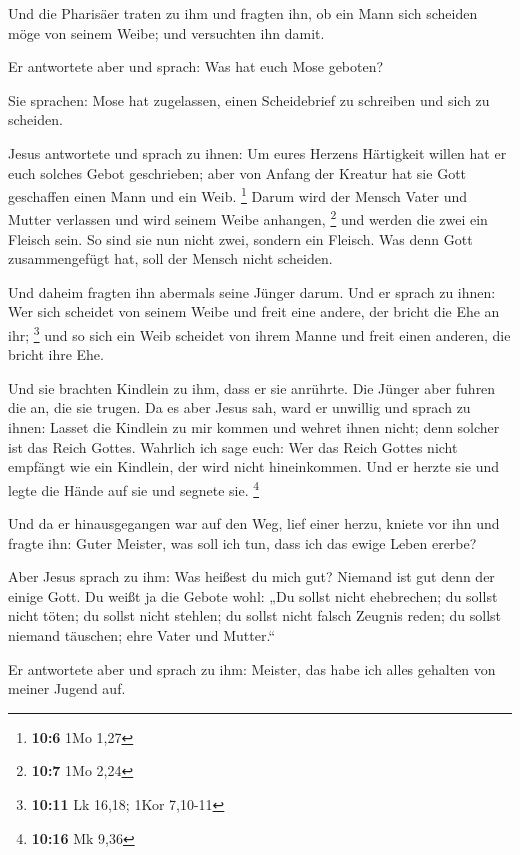  Und die Pharisäer traten zu ihm und fragten ihn, ob ein
Mann sich scheiden möge von seinem Weibe; und versuchten ihn damit.

 Er antwortete aber und sprach: Was hat euch Mose geboten?

 Sie sprachen: Mose hat zugelassen, einen Scheidebrief zu
schreiben und sich zu scheiden.

 Jesus antwortete und sprach zu ihnen: Um eures Herzens
Härtigkeit willen hat er euch solches Gebot geschrieben; 
aber von Anfang der Kreatur hat sie Gott geschaffen einen Mann und ein
Weib. \footnote{\textbf{10:6} 1Mo 1,27}  Darum wird der
Mensch Vater und Mutter verlassen und wird seinem Weibe anhangen,
\footnote{\textbf{10:7} 1Mo 2,24}  und werden die zwei ein
Fleisch sein. So sind sie nun nicht zwei, sondern ein Fleisch.
 Was denn Gott zusammengefügt hat, soll der Mensch nicht
scheiden.

 Und daheim fragten ihn abermals seine Jünger darum.
 Und er sprach zu ihnen: Wer sich scheidet von seinem
Weibe und freit eine andere, der bricht die Ehe an ihr; \footnote{\textbf{10:11}
  Lk 16,18; 1Kor 7,10-11}  und so sich ein Weib scheidet
von ihrem Manne und freit einen anderen, die bricht ihre Ehe.

 Und sie brachten Kindlein zu ihm, dass er sie anrührte.
Die Jünger aber fuhren die an, die sie trugen.  Da es
aber Jesus sah, ward er unwillig und sprach zu ihnen: Lasset die
Kindlein zu mir kommen und wehret ihnen nicht; denn solcher ist das
Reich Gottes.  Wahrlich ich sage euch: Wer das Reich
Gottes nicht empfängt wie ein Kindlein, der wird nicht hineinkommen.
 Und er herzte sie und legte die Hände auf sie und
segnete sie. \footnote{\textbf{10:16} Mk 9,36}

 Und da er hinausgegangen war auf den Weg, lief einer
herzu, kniete vor ihn und fragte ihn: Guter Meister, was soll ich tun,
dass ich das ewige Leben ererbe?

 Aber Jesus sprach zu ihm: Was heißest du mich gut?
Niemand ist gut denn der einige Gott.  Du weißt ja die
Gebote wohl: „Du sollst nicht ehebrechen; du sollst nicht töten; du
sollst nicht stehlen; du sollst nicht falsch Zeugnis reden; du sollst
niemand täuschen; ehre Vater und Mutter.``

 Er antwortete aber und sprach zu ihm: Meister, das habe
ich alles gehalten von meiner Jugend auf.

